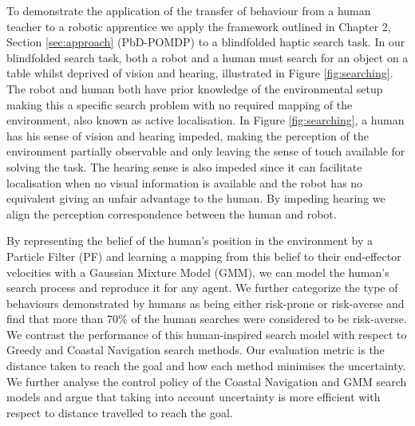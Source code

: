 To demonstrate the application of the transfer of behaviour from a human teacher to a robotic apprentice we apply the framework outlined in Chapter 2, 
Section \ref{sec:approach} (PbD-POMDP) to a blindfolded haptic search task. In our blindfolded search task, both a robot and a human 
must search for an object on a table whilst deprived of vision and hearing, illustrated in Figure \ref{fig:searching}. 
The robot and human both have prior knowledge of the environmental setup making this a specific search problem with no required mapping of the environment, also known as active localisation. 
In Figure \ref{fig:searching}, a human has his sense of vision and hearing impeded, making the perception of the environment partially observable and 
only leaving the sense of touch available for solving the task. The hearing sense is also impeded since it can 
facilitate localisation when no visual information is available and the robot has no equivalent giving an unfair 
advantage to the human. By impeding hearing we align the perception correspondence between the human and robot.

By representing the belief of the human's position in the environment by a Particle Filter (PF) and learning a mapping from this belief 
to their end-effector velocities with a Gaussian Mixture Model (GMM), we can model the human's search process and reproduce it for any agent. 
We further categorize the type of behaviours demonstrated by humans as being either risk-prone or risk-averse and find that more than 70\% of 
the human searches were considered to be risk-averse. We contrast the performance of this human-inspired search model with respect to Greedy and Coastal Navigation search methods. 
Our evaluation metric is the distance taken to reach the goal and how each method minimises the uncertainty.
We further analyse the control policy of the Coastal Navigation and GMM search models and argue that taking 
into account uncertainty is more efficient with respect to distance travelled to reach the goal.

